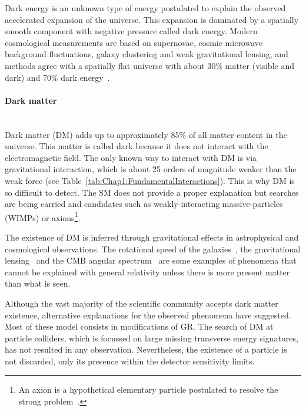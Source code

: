 Dark energy is an unknown type of energy postulated to explain the observed accelerated expansion of the universe.
This expansion is dominated by a spatially smooth component with negative pressure called dark energy.  
Modern cosmological measurements are based on supernovae, cosmic microwave background fluctuations,
galaxy clustering and weak gravitational lensing, and methods agree with a spatially flat universe with about 30\% matter (visible
and dark) and 70\% dark energy~\cite{Planck:2018vyg}.



\paragraph{Dark matter}\mbox{}\\
Dark matter (DM) adds up to approximately 85\% of all matter content in the universe. %
This matter is called dark because it does not interact with the electromagnetic field. %
The only known way to interact with DM is via gravitational interaction, which is about 25 orders of
magnitude weaker than the weak force (see Table~\ref{tab:Chap1:FundamentalInteractions}). This is why DM is so difficult to detect. 
The SM does not provide a proper explanation but searches are being carried and candidates such as 
weakly-interacting massive-particles (WIMPs) or axions\footnote{An axion is a hypothetical elementary particle postulated to resolve the strong \CP problem~\cite{Weinberg:1977ma, Wilczek:1977pj}.}.

The existence of DM is inferred through gravitational effects in astrophysical and cosmological observations. 
The rotational speed of the galaxies~\cite{Rubin:1970zza}, the gravitational lensing~\cite{Taylor:1998uk} and the CMB angular spectrum~\cite{Planck:2015fie} are
some examples of phenomena that cannot be explained with general relativity unless there is more present matter than what is seen.

Although the vast majority of the scientific community accepts dark matter existence, alternative explanations for the observed phenomena have suggested. 
Most of these model consists in modifications of GR.
The search of DM at particle colliders, which is focussed on large missing transverse energy signatures, has not resulted in any observation. Nevertheless,
the existence of a particle is not discarded, only its presence within the detector sensitivity limits.

